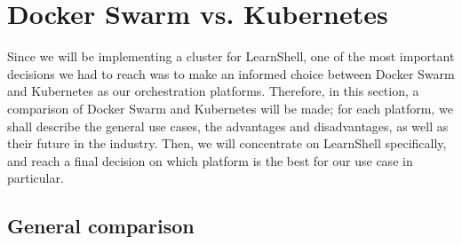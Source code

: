 \documentclass[thesis=B,english]{FITthesis}[2019/12/23]
\begin{document}
\section{Docker Swarm vs. Kubernetes}

Since we will be implementing a cluster for LearnShell, one of the most important decisions we had to reach was to make an informed choice between Docker Swarm and Kubernetes as our orchestration platforms. Therefore, in this section, a comparison of Docker Swarm and Kubernetes will be made; for each platform, we shall describe the general use cases, the advantages and disadvantages, as well as their future in the industry. Then, we will concentrate on LearnShell specifically, and reach a final decision on which platform is the best for our use case in particular.

\subsection{General comparison}
\end{document}
